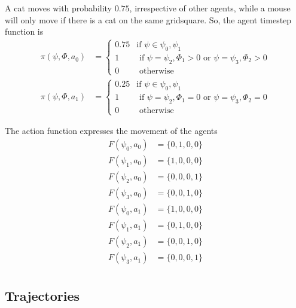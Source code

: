 \documentclass{article}
\begin{document}
A cat moves with probability $0.75$, irrespective of other agents, while a mouse will only move if there is a cat on the same gridsquare. So, the agent timestep function is
\begin{equation}
\begin{aligned}
\pi(\psi, \Phi, a_0) &=
\begin{cases}
0.75 & \text{if } \psi \in {\psi_0, \psi_1}\\
1 & \text{ if } \psi = \psi_2, \Phi_1 > 0 \text{ or } \psi=\psi_3, \Phi_2 > 0\\
0 & \text{ otherwise}
\end{cases}\\
\pi(\psi, \Phi, a_1) &=
\begin{cases}
0.25 & \text{if } \psi \in {\psi_0, \psi_1}\\
1 & \text{ if } \psi = \psi_2, \Phi_1 = 0 \text{ or } \psi=\psi_3, \Phi_2 = 0\\
0 & \text{ otherwise}
\end{cases}
\end{aligned}
\end{equation}

The action function expresses the movement of the agents
\begin{equation}
\begin{aligned}
F(\psi_0, a_0) &= \{0,1,0,0\}\\
F(\psi_1, a_0) &= \{1,0,0,0\}\\
F(\psi_2, a_0) &= \{0,0,0,1\}\\
F(\psi_3, a_0) &= \{0,0,1,0\}\\
F(\psi_0, a_1) &= \{1,0,0,0\}\\
F(\psi_1, a_1) &= \{0,1,0,0\}\\
F(\psi_2, a_1) &= \{0,0,1,0\}\\
F(\psi_3, a_1) &= \{0,0,0,1\}\\
\end{aligned}
\end{equation}

\subsection{Trajectories}
\end{document}

